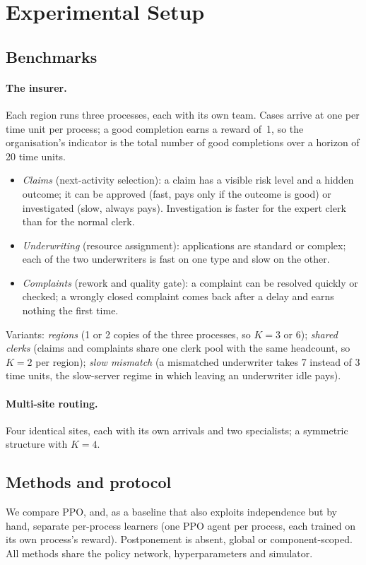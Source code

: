 \section{Experimental Setup}\label{sec:setup}

\subsection{Benchmarks}
\paragraph{The insurer.} Each region runs three processes, each with its own team.
Cases arrive at one per time unit per process; a good completion earns a reward of~1,
so the organisation's indicator is the total number of good completions over a horizon
of 20 time units.
\begin{itemize}
  \item \emph{Claims} (next-activity selection): a claim has a visible risk level and a
    hidden outcome; it can be approved (fast, pays only if the outcome is good) or
    investigated (slow, always pays). Investigation is faster for the expert clerk than
    for the normal clerk.
  \item \emph{Underwriting} (resource assignment): applications are standard or complex;
    each of the two underwriters is fast on one type and slow on the other.
  \item \emph{Complaints} (rework and quality gate): a complaint can be resolved quickly
    or checked; a wrongly closed complaint comes back after a delay and earns nothing the
    first time.
\end{itemize}
Variants: \emph{regions} (1 or 2 copies of the three processes, so $K=3$ or $6$);
\emph{shared clerks} (claims and complaints share one clerk pool with the same headcount,
so $K=2$ per region); \emph{slow mismatch} (a mismatched underwriter takes 7 instead of 3
time units, the slow-server regime in which leaving an underwriter idle pays).

\paragraph{Multi-site routing.} Four identical sites, each with its own arrivals and two
specialists; a symmetric structure with $K=4$.

\subsection{Methods and protocol}
We compare PPO, \nfgae{} and, as a baseline that also exploits independence but by hand,
separate per-process learners (one PPO agent per process, each trained on its own
process's reward). Postponement is absent, global or component-scoped. All methods share
the policy network, hyperparameters and simulator. 

